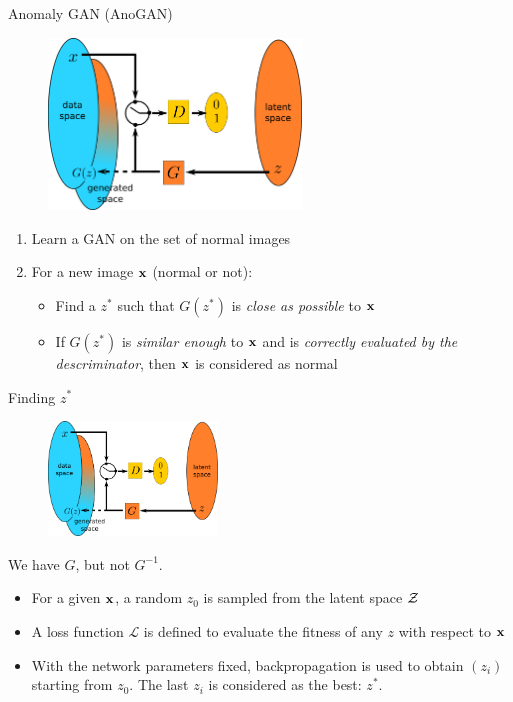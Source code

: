 \documentclass[xcolor=pdftex,dvipsnames,table,mathserif]{beamer}
\begin{document}
\begin{frame}{Anomaly GAN (AnoGAN) \cite{schlegl_unsupervised_2017}}

  \begin{figure}[ht]
    \centering
    \includegraphics[width=0.6\textwidth]{gan2}
  \end{figure}

  \begin{enumerate}
  \item Learn a GAN on the set of normal images
  \item For a new image $\mathbf{x}$ (normal or not):
    \begin{itemize}
    \item Find a $z^*$ such that $G(z^*)$ is \emph{close as possible} to $\mathbf{x}$
    \item If $G(z^*)$ is \emph{similar enough} to $\mathbf{x}$ and is \emph{correctly evaluated by the descriminator}, then $\mathbf{x}$ is considered as normal
    \end{itemize}
  \end{enumerate}

\end{frame}

\begin{frame}{Finding $z^*$}

  \begin{figure}[ht]
    \centering
    \includegraphics[width=0.4\textwidth]{gan2}
  \end{figure}

  We have $G$, but not $G^{-1}$.

  \begin{itemize}
  \item For a given $\mathbf{x}$, a random $z_0$ is sampled from the latent space $\cal{Z}$
  \item A loss function $\mathcal{L}$ is defined to evaluate the fitness of any $z$ with respect to $\mathbf{x}$
  \item With the network parameters fixed, backpropagation is used to obtain $(z_i)$ starting from $z_0$. The last $z_i$ is considered as the best: $z^*$.
  \end{itemize}

\end{frame}
\end{document}

